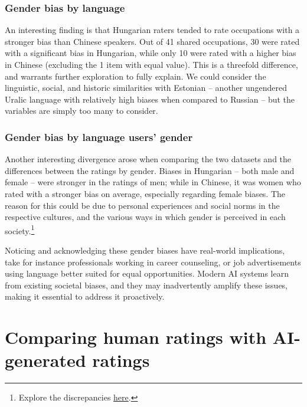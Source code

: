 \documentclass[10pt, a4paper]{article}
\begin{document}
\subsubsection{Gender bias by language}

An interesting finding is that Hungarian raters tended to rate occupations with a stronger bias than Chinese speakers. Out of 41 shared occupations, 30 were rated with a significant bias in Hungarian, while only 10 were rated with a higher bias in Chinese (excluding the 1 item with equal value). This is a threefold difference,
and warrants further exploration to fully explain. We could consider the linguistic, social, and historic similarities with Estonian -- another ungendered Uralic language with relatively high biases when compared to Russian \citep{kaukonen_2025_gender} -- but the variables are simply too many to consider. 

\subsubsection{Gender bias by language users' gender}

Another interesting divergence arose when comparing the two datasets and the differences between the ratings by gender. Biases in Hungarian -- both male and female -- were stronger in the ratings of men; while in Chinese, it was women who rated with a stronger bias on average, especially regarding female biases. The reason for this could be due to personal experiences and social norms in the respective cultures, and the various ways in which gender is perceived in each society.\footnote{Explore the discrepancies \href{https://anonymous.4open.science/api/repo/occupational-gender-bias/file/confusion_matrices.html?v=1d305345}{here}.} 

Noticing and acknowledging these gender biases have real-world implications, take for instance professionals working in career counseling, or job advertisements using language better suited for equal opportunities. Modern AI systems learn from existing societal biases, and they may inadvertently amplify these issues, making it essential to address it proactively.

\section{Comparing human ratings with AI-generated ratings}
\label{sec:ai_comparison}
\end{document}
